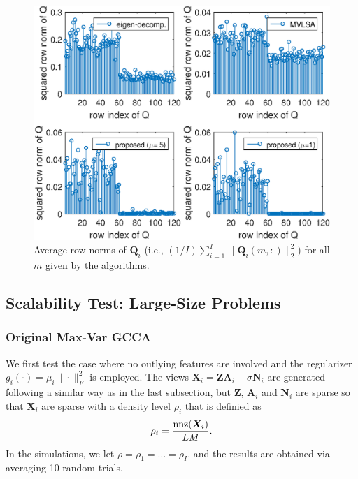 \documentclass[10pt,journal]{IEEEtran}
\newcommand{\X}{\boldsymbol{X}}
\begin{document}
\begin{figure}[ht]
\centering
{\includegraphics[width=\linewidth]{small_sparse.eps}
\caption{Average row-norms of ${\bm Q}_i$ (i.e., $(1/I)\sum_{i=1}^I\|{\bm Q}_i(m,:)\|_2^2$) for all $m$ given by the algorithms.}
\label{fig:small_row_norm}}
\end{figure}

\subsection{Scalability Test: Large-Size Problems}

\subsubsection{Original Max-Var GCCA}
We first test the case where no outlying features are involved
and the regularizer $g_i(\cdot)=\mu_i\|\cdot\|_F^2$ is employed.
The views $\X_i={\bm Z}{\bm A}_i+\sigma {\bm N}_i$ are generated following a similar way as in the last subsection, but ${\bm Z}$, ${\bm A}_i$ and ${\bm N}_i$ are sparse so that ${\bm X}_i$ are sparse with a density level $\rho_i$ that is definied as
\[ \rho_i = \frac{{\rm nnz}({\bm X}_i)}{LM}.\]
In the simulations, we let $\rho=\rho_1=\ldots=\rho_I$.
and the results are obtained via averaging 10 random trials.
\end{document}
